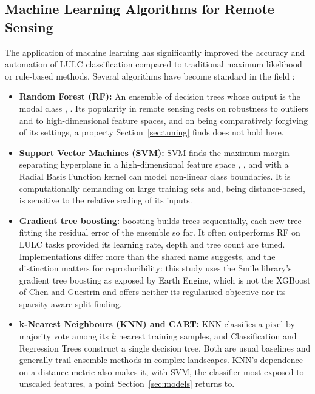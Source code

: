 \documentclass[conference]{IEEEtran}
\begin{document}
\subsection{Machine Learning Algorithms for Remote Sensing}
The application of machine learning has significantly improved the accuracy and automation of LULC classification compared to traditional maximum likelihood or rule-based methods. Several algorithms have become standard in the field \cite{r8}:
\begin{itemize}
    \item \textbf{Random Forest (RF):} An ensemble of decision trees whose output is the modal class \cite{r9}, \cite{r11}. Its popularity in remote sensing rests on robustness to outliers and to high-dimensional feature spaces, and on being comparatively forgiving of its settings, a property Section~\ref{sec:tuning} finds does not hold here.
    \item \textbf{Support Vector Machines (SVM):} SVM finds the maximum-margin separating hyperplane in a high-dimensional feature space \cite{r7}, \cite{r12}, and with a Radial Basis Function kernel can model non-linear class boundaries. It is computationally demanding on large training sets and, being distance-based, is sensitive to the relative scaling of its inputs.
    \item \textbf{Gradient tree boosting:} boosting \cite{r27} builds trees sequentially, each new tree fitting the residual error of the ensemble so far. It often outperforms RF on LULC tasks provided its learning rate, depth and tree count are tuned. Implementations differ more than the shared name suggests, and the distinction matters for reproducibility: this study uses the Smile library's gradient tree boosting as exposed by Earth Engine, which is not the XGBoost of Chen and Guestrin \cite{r13} and offers neither its regularised objective nor its sparsity-aware split finding.
    \item \textbf{k-Nearest Neighbours (KNN) and CART:} KNN classifies a pixel by majority vote among its $k$ nearest training samples, and Classification and Regression Trees construct a single decision tree. Both are usual baselines and generally trail ensemble methods in complex landscapes. KNN's dependence on a distance metric also makes it, with SVM, the classifier most exposed to unscaled features, a point Section~\ref{sec:models} returns to.
\end{itemize}
\end{document}
